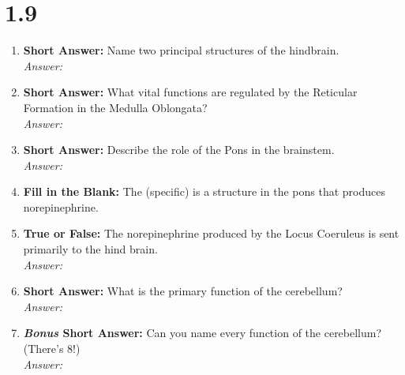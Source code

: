 \section*{1.9 \squigglyline}
\begin{enumerate}[label=\textbf{Q1.9.\arabic*}]
      \item \textbf{Short Answer:} Name two principal structures of the hindbrain. \\
            \textit{Answer:} \\%

      \item \textbf{Short Answer:} What vital functions are regulated by the Reticular Formation in the Medulla Oblongata? \\
            \textit{Answer:} \\ %

      \item \textbf{Short Answer:} Describe the role of the Pons in the brainstem. \\
            \textit{Answer:} %

      \item \textbf{Fill in the Blank:} The \underline{\hspace{3cm}} (specific) is a structure in the pons that produces norepinephrine. \\

      \item \textbf{True or False:} The norepinephrine produced by the Locus Coeruleus is sent primarily to the hind brain. \\
            \textit{Answer:} %

      \item \textbf{Short Answer:} What is the primary function of the cerebellum? \\
            \textit{Answer:} %

      \item \textbf{\textit{Bonus} Short Answer:} Can you name every function of the cerebellum? (There's 8!) \\
            \textit{Answer:} \\[0.5em]%


\end{enumerate}
